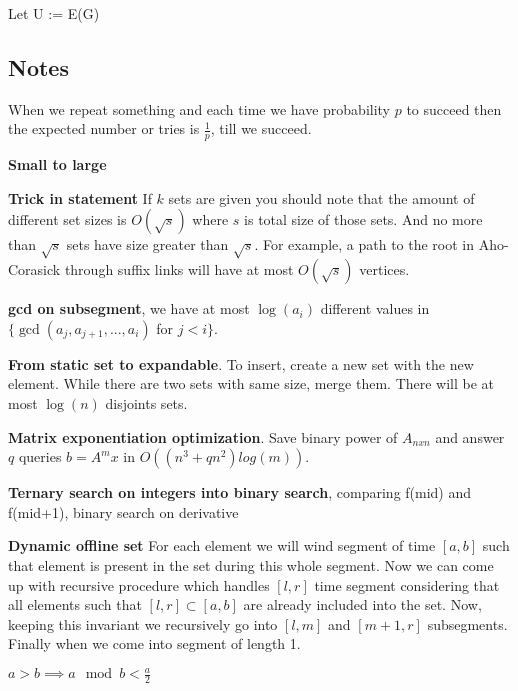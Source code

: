 \documentclass[a4paper,10pt,oneside]{article}
\begin{document}
\begin{multicols}{2}
\begin{algorithm}[H]
\SetAlgoLined
{}
Let U := E(G)\;
\end{algorithm}

\subsection{Notes}
When we repeat something and each time we have probability $p$ to succeed then the expected number or tries is $\frac{1}{p}$, till we succeed.

\textbf{Small to large}

\textbf{Trick in statement} If $k$ sets are given you should note that the amount of different set sizes is $O(\sqrt{s})$ where $s$ is total size of those sets. And no more than $\sqrt{s}$ sets have size greater than $\sqrt{s}$. For example, a path to the root in Aho-Corasick through suffix links will have at most $O(\sqrt{s})$ vertices.

\textbf{gcd on subsegment}, we have at most $\log(a_i)$ different values in $\{\gcd(a_j, a_{j+1}, ..., a_i)$ for $j < i\}$.

\textbf{From static set to expandable}. To insert, create a new set with the new element. While there are two sets with same size, merge them. There will be at most $\log(n)$ disjoints sets.

\textbf{Matrix exponentiation optimization}. Save binary power of $A_{nxn}$ and answer $q$ queries $b = A^mx$ in $O((n^3 + qn^2)log(m))$.

\textbf{Ternary search on integers into binary search}, comparing f(mid) and f(mid+1), binary search on derivative

\textbf{Dynamic offline set} For each element we will wind segment of time $[a, b]$ such that element is present in the set during this whole segment. Now we can come up with recursive procedure which handles $[l, r]$ time segment considering that all elements such that $[l, r] \subset [a, b]$ are already included into the set. Now, keeping this invariant we recursively go into $[l, m]$ and $[m+1, r]$ subsegments. Finally when we come into segment of length 1.

$a > b \implies a \mod b < \frac{a}{2}$

\end{multicols}
\end{document}
